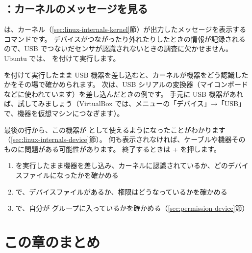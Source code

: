 \subsection{：カーネルのメッセージを見る}

 は、カーネル（\ref{sec:linux-internals-kernel}節）が出力したメッセージを表示するコマンドです。
デバイスがつながったり外れたりしたときの情報が記録されるので、USB でつないだセンサが認識されないときの調査に欠かせません。
Ubuntu では、 を付けて実行します。

 を付けて実行したまま USB 機器を差し込むと、カーネルが機器をどう認識したかをその場で確かめられます。
次は、USB シリアルの変換器（マイコンボードなどに使われています）を差し込んだときの例です。
手元に USB 機器があれば、試してみましょう（VirtualBox では、メニューの「デバイス」→「USB」で、機器を仮想マシンにつなぎます）。


最後の行から、この機器が  として使えるようになったことがわかります（\ref{sec:linux-internals-device}節）。
何も表示されなければ、ケーブルや機器そのものに問題がある可能性があります。
終了するときは + を押します。

\begin{point}[センサが認識されないときの確認の手順]
  \begin{enumerate}
    \item {} を実行したまま機器を差し込み、カーネルに認識されているか、どのデバイスファイルになったかを確かめる
    \item {} で、デバイスファイルがあるか、権限はどうなっているかを確かめる
    \item {} で、自分が  グループに入っているかを確かめる（\ref{sec:permission-device}節）
  \end{enumerate}
\end{point}

\section*{この章のまとめ}

